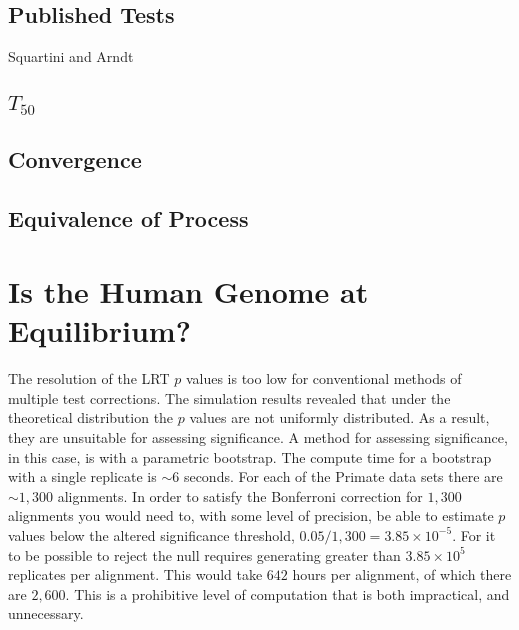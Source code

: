 \subsection{Published Tests}
Squartini and Arndt 


% 

\subsection{$T_{50}$}

% 

% 

\subsection{Convergence}

% 

\subsection{Equivalence of Process}

\section{Is the Human Genome at Equilibrium?}

The resolution of the LRT $p$ values is too low for conventional methods of multiple test corrections. The simulation results revealed that under the theoretical distribution the $p$ values are not uniformly distributed. As a result, they are unsuitable for assessing significance. A method for assessing significance, in this case, is with a parametric bootstrap. The compute time for a bootstrap with a single replicate is ${\sim} 6$ seconds. For each of the Primate data sets there are ${\sim} 1,300$ alignments. In order to satisfy the Bonferroni correction for $1,300$ alignments you would need to, with some level of precision, be able to estimate $p$ values below the altered significance threshold, $0.05/1,300 = 3.85{\times}10^{-5}$. For it to be possible to reject the null requires generating greater than $3.85{\times}10^{5}$ replicates per alignment. This would take $642$ hours per alignment, of which there are $2,600$. This is a prohibitive level of computation that is both impractical, and unnecessary. 

